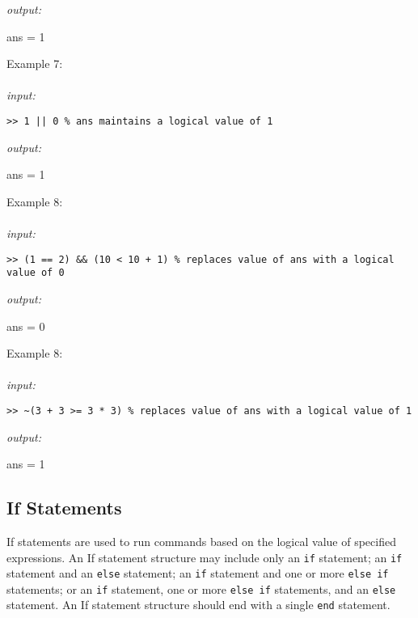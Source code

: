 \documentclass[../MATLAB_Primer.tex]{subfiles}
\begin{document}
\textit{output:}

\begin{center}
    ans = 1
\end{center}

Example 7:
\\ \\
\textit{input:}
\begin{lstlisting}[frame=single]
>> 1 || 0 % ans maintains a logical value of 1
\end{lstlisting}

\textit{output:}

\begin{center}
    ans = 1
\end{center}

Example 8:
\\ \\
\textit{input:}
\begin{lstlisting}[frame=single]
>> (1 == 2) && (10 < 10 + 1) % replaces value of ans with a logical value of 0
\end{lstlisting}

\textit{output:}

\begin{center}
    ans = 0
\end{center}

Example 8:
\\ \\
\textit{input:}
\begin{lstlisting}[frame=single]
>> ~(3 + 3 >= 3 * 3) % replaces value of ans with a logical value of 1
\end{lstlisting}

\textit{output:}

\begin{center}
    ans = 1
\end{center}

\subsection{If Statements} \label{If Statements}
If statements are used to run commands based on the logical value of specified expressions. An If statement structure may include only an \texttt{if} statement; an \texttt{if} statement and an \texttt{else} statement; an \texttt{if} statement and one or more \texttt{else if} statements; or an \texttt{if} statement, one or more \texttt{else if} statements, and an \texttt{else} statement. An If statement structure should end with a single \texttt{end} statement.
\end{document}
